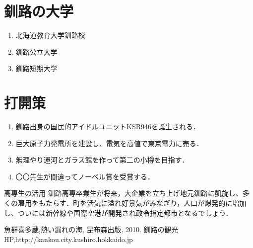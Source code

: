 \documentclass[a4j, twocolumn]{jarticle}
\begin{document}
\section{釧路の大学}
\begin{enumerate}
    \item 北海道教育大学釧路校
    \item 釧路公立大学
    \item 釧路短期大学
\end{enumerate}

\section{打開策}
\begin{shadebox}
    \begin{enumerate}
        \item 釧路出身の国民的アイドルユニットKSR946を誕生される．
        \item 巨大原子力発電所を建設し、電気を高値で東京電力に売る．
        \item 無理やり運河とガラス館を作って第二の小樽を目指す．
        \item 〇〇先生が間違ってノーベル賞を受賞する．
    \end{enumerate}
\end{shadebox}
\begin{itembox}{高専生の活用}
    釧路高専卒業生が将来，大企業を立ち上げ地元釧路に凱旋し、多くの雇用をもたらす．町を活気に溢れ好景気がみなぎり，人口が爆発的に増加し、ついには新幹線や国際空港が開発され政令指定都市となるでしょう．
\end{itembox}

\begin{thebibliography}{99}
    魚群喜多蔵,熱い漏れの海, 昆布森出版, 2010.
    釧路の観光HP,http://kankou.city.kushiro.hokkaido.jp
\end{thebibliography}
\end{document}
